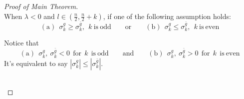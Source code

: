 \documentclass[12pt]{amsart}
\newcommand{\bg}{\bar{g}}
\numberwithin{equation}{section}
\begin{document}
\begin{proof}[Proof of Main Theorem]
    \ \\

    When $\lambda<0$ and $l\in\left(\frac{n}{2},\frac{n}{2}+k\right)$, if one of the following assumption holds:
    \begin{equation*}
        \mathrm{(a)}\ \ \sigma_k^g \geq \sigma_k^{\bg}, \ \ k \ \mathrm{is\  odd}\qquad\mathrm{or}\qquad\mathrm{(b)}\ \  \sigma_k^g \leq \sigma_k^{\bg}, \ \ k \ \mathrm{is\  even}
    \end{equation*}

    Notice that 
    \begin{equation*}
        \mathrm{(a)}\ \ \sigma_k^g,\ \sigma_k^{\bg}<0 \ \ \mathrm{for}\ \ k \ \ \mathrm{is\  odd}\qquad\mathrm{and}\qquad\mathrm{(b)}\ \ \sigma_k^g,\ \sigma_k^{\bg}>0 \ \ \mathrm{for}\ \ k \ \ \mathrm{is\  even}
    \end{equation*}
    It's equivalent to say $|\sigma_k^g|\leq|\sigma_k^{\bg}|$.

    \ \\


\end{proof}
\end{document}
